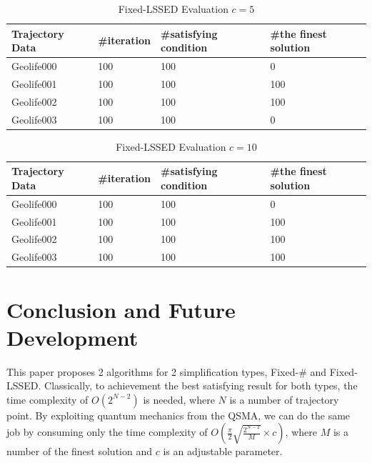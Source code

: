 \documentclass[conference]{IEEEtran}
\begin{document}
	\begin{table}[]
		\caption{Fixed-LSSED Evaluation $c=5$}
		\label{table:evalSED}
		\begin{tabular}{|l|l|l|l|}
			\hline
			Trajectory Data & \#iteration & \#satisfying condition & \#the finest solution \\ \hline
			Geolife000         & 100         & 100                     & 0                \\ \hline
			Geolife001            & 100         & 100                     & 100                \\ \hline
			Geolife002           & 100         & 100                     & 100                \\ \hline
			Geolife003            & 100         & 100                     & 0                \\ \hline
		\end{tabular}
	\end{table}
	\begin{table}[]
		\caption{Fixed-LSSED Evaluation $c=10$}
		\label{table:evalSED2}
		\begin{tabular}{|l|l|l|l|}
			\hline
			Trajectory Data & \#iteration & \#satisfying condition & \#the finest solution \\ \hline
			Geolife000         & 100         & 100                     & 0                \\ \hline
			Geolife001            & 100         & 100                     & 100                \\ \hline
			Geolife002           & 100         & 100                     & 100                \\ \hline
			Geolife003            & 100         & 100                     & 100                \\ \hline
		\end{tabular}
	\end{table}
	
	
	
	\section*{Conclusion and Future Development}

	This paper proposes 2 algorithms for 2 simplification types, Fixed-\# and Fixed-LSSED. Classically, to achievement the best satisfying result for both types, the time complexity of $O(2^{N-2})$ is needed, where $N$ is a number of trajectory point. By exploiting quantum mechanics from the QSMA, we can do the same job by consuming only the time complexity of $O(\frac{\pi}{2}\sqrt{\frac{2^{N-2}}{M}} \times c)$, where $M$ is a number of the finest solution and $c$ is an adjustable parameter.
	
\end{document}
